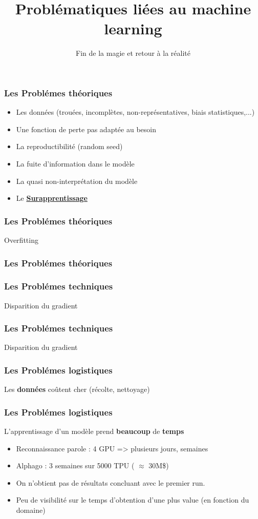 \documentclass{formation}
\title{Problématiques liées au machine learning}
\subtitle{Fin de la magie et retour à la réalité}
\begin{document}
\maketitle

\begin{frame}
  \frametitle{Les Problémes théoriques}
  \begin{itemize}
  \item Les données (trouées, incomplètes, non-représentatives, biais statistiques,...)
  \item Une fonction de perte pas adaptée au besoin
  \item La reproductibilité (random seed)
  \item La fuite d'information dans le modèle
  \item La quasi non-interprétation du modèle
  \item Le \underline{\textbf{Surapprentissage}}
  \end{itemize}
\end{frame}

\begin{frame}
  \frametitle{Les Problémes théoriques}
  Overfitting
\end{frame}

\begin{frame}
  \frametitle{Les Problémes théoriques}
\end{frame}

\begin{frame}
  \frametitle{Les Problémes techniques}
  Disparition du gradient
\end{frame}

\begin{frame}
  \frametitle{Les Problémes techniques}
  Disparition du gradient
  \newline
  \newline
\end{frame}

\begin{frame}
  \frametitle{Les Problémes logistiques}
  Les \textbf{données} coûtent cher (récolte, nettoyage)
\end{frame}

\begin{frame}
  \frametitle{Les Problémes logistiques}
  L'apprentissage d'un modèle prend \textbf{beaucoup} de \textbf{temps}
  \begin{itemize}
  \item Reconnaissance parole : 4 GPU => plusieurs jours, semaines
  \item Alphago : 3 semaines sur 5000 TPU ( $\approx$ 30M\$)
  \item On n'obtient pas de résultats concluant avec le premier run.
  \item Peu de visibilité sur le temps d'obtention d'une plus value (en fonction du domaine)
  \end{itemize}
  
\end{frame}
\end{document}
